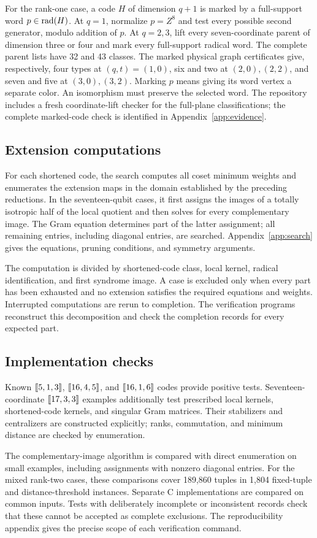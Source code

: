 For the rank-one case, a code \(H\) of dimension \(q+1\) is marked
by a full-support word \(p\in\operatorname{rad}(H)\). At \(q=1\), normalize
\(p=Z^8\) and test every possible second generator, modulo addition
of \(p\). At \(q=2,3\), lift every seven-coordinate parent of dimension
three or four and mark every full-support radical word. The complete
parent lists have 32 and 43 classes. The marked physical graph
certificates give, respectively, four types at \((q,t)=(1,0)\),
six and two at \((2,0),(2,2)\), and seven and five at
\((3,0),(3,2)\). Marking \(p\) means giving its word vertex a
separate color. An isomorphism must preserve the selected word.
The repository includes a fresh coordinate-lift checker for
the full-plane classifications; the complete marked-code check is
identified in Appendix~\ref{app:evidence}.

\subsection{Extension computations}

For each shortened code, the search computes all coset minimum weights
and enumerates the extension maps in the domain established by the
preceding reductions. In the seventeen-qubit cases, it first assigns the
images of a totally isotropic half of the local quotient and then solves
for every complementary image. The Gram equation determines part of the
latter assignment; all remaining entries, including diagonal entries,
are searched. Appendix~\ref{app:search} gives the equations, pruning
conditions, and symmetry arguments.

The computation is divided by shortened-code class, local kernel,
radical identification, and first syndrome image. A case is excluded
only when every part has been exhausted and no extension satisfies the
required equations and weights. Interrupted computations are rerun to
completion. The verification programs reconstruct this decomposition
and check the completion records for every expected part.

\subsection{Implementation checks}

Known \([\![5,1,3]\!]\), \([\![16,4,5]\!]\), and \([\![16,1,6]\!]\)
codes provide positive tests. Seventeen-coordinate \([\![17,3,3]\!]\)
examples additionally test prescribed local kernels, shortened-code
kernels, and singular Gram matrices. Their stabilizers and centralizers
are constructed explicitly; ranks, commutation, and minimum distance are
checked by enumeration.

The complementary-image algorithm is compared with direct enumeration
on small examples, including assignments with nonzero diagonal entries.
For the mixed rank-two cases, these comparisons cover 189,860 tuples
in 1,804 fixed-tuple and distance-threshold instances. Separate C
implementations are compared on common inputs. Tests with deliberately
incomplete or inconsistent records check that these cannot be accepted
as complete exclusions. The reproducibility appendix gives the precise
scope of each verification command.
